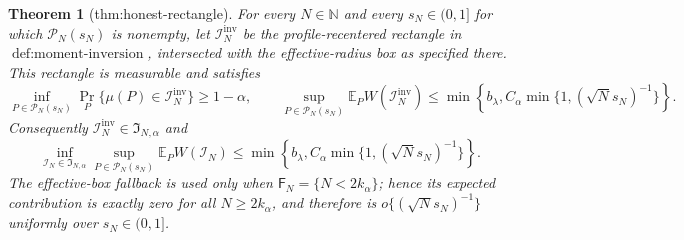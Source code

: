 \documentclass{article}
\newtheorem{theorem}{Theorem}
\begin{document}
\begin{theorem}[thm:honest-rectangle]\label{thm:honest-rectangle}
For every \(N\in\mathbb N\) and every \(s_N\in(0,1]\) for which \(\mathcal P_N(s_N)\) is nonempty, let \(\mathcal I_N^{\mathrm{inv}}\) be the profile-recentered rectangle in \(\operatorname{def:moment\text{-}inversion}\), intersected with the effective-radius box as specified there. This rectangle is measurable and satisfies
\[
\inf_{P\in\mathcal P_N(s_N)}
\Pr_P\{\mu(P)\in\mathcal I_N^{\mathrm{inv}}\}\ge 1-\alpha,
\qquad
\sup_{P\in\mathcal P_N(s_N)}
\mathbb E_P W(\mathcal I_N^{\mathrm{inv}})
\le \min\!\left\{b_\lambda,
C_\alpha\min\{1,(\sqrt N s_N)^{-1}\}\right\}.
\]
Consequently \(\mathcal I_N^{\mathrm{inv}}\in\mathfrak I_{N,\alpha}\) and
\[
\inf_{\mathcal I_N\in\mathfrak I_{N,\alpha}}
\sup_{P\in\mathcal P_N(s_N)}\mathbb E_PW(\mathcal I_N)
\le \min\!\left\{b_\lambda,
C_\alpha\min\{1,(\sqrt N s_N)^{-1}\}\right\}.
\]
The effective-box fallback is used only when \(\mathsf F_N=\{N<2k_\alpha\}\); hence its expected contribution is exactly zero for all \(N\ge2k_\alpha\), and therefore is \(o\{(\sqrt N s_N)^{-1}\}\) uniformly over \(s_N\in(0,1]\).
\end{theorem}
\end{document}
